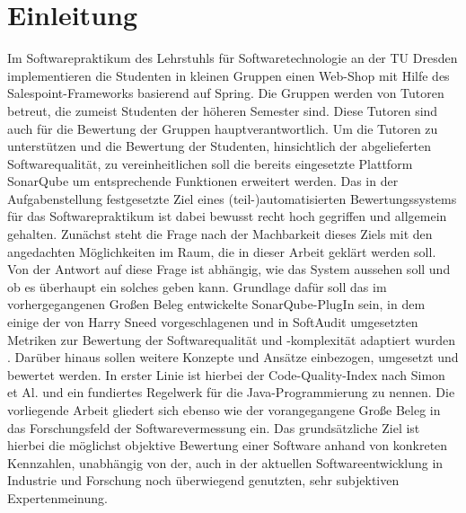 \documentclass[da,ngerman]{stthesis}
\begin{document}
	\chapter{Einleitung}
  		Im Softwarepraktikum des Lehrstuhls für Softwaretechnologie an der TU Dresden implementieren die Studenten in kleinen Gruppen einen Web-Shop mit Hilfe des Salespoint-Frameworks basierend auf Spring. Die Gruppen werden von Tutoren betreut, die zumeist Studenten der höheren Semester sind. Diese Tutoren sind auch für die Bewertung der Gruppen hauptverantwortlich. Um die Tutoren zu unterstützen und die Bewertung der Studenten, hinsichtlich der abgelieferten Softwarequalität, zu vereinheitlichen soll die bereits eingesetzte Plattform SonarQube um entsprechende Funktionen erweitert werden. Das in der Aufgabenstellung festgesetzte Ziel eines (teil-)automatisierten Bewertungssystems für das Softwarepraktikum ist dabei bewusst recht hoch gegriffen und allgemein gehalten. Zunächst steht die Frage nach der Machbarkeit dieses Ziels mit den angedachten Möglichkeiten im Raum, die in dieser Arbeit geklärt werden soll. Von der Antwort auf diese Frage ist abhängig, wie das System aussehen soll und ob es überhaupt ein solches geben kann. \newline
  		Grundlage dafür soll das im vorhergegangenen Großen Beleg entwickelte SonarQube-PlugIn sein, in dem einige der von Harry Sneed vorgeschlagenen und in SoftAudit umgesetzten Metriken zur Bewertung der Softwarequalität und -komplexität adaptiert wurden \cite{grosserBeleg}. Darüber hinaus sollen weitere Konzepte und Ansätze einbezogen, umgesetzt und bewertet werden. In erster Linie ist hierbei der Code-Quality-Index nach Simon et Al. \cite{CodeQualityManagement} und ein fundiertes Regelwerk für die Java-Programmierung zu nennen. \newline
  		Die vorliegende Arbeit gliedert sich ebenso wie der vorangegangene Große Beleg in das Forschungsfeld der Softwarevermessung ein. Das grundsätzliche Ziel ist hierbei die möglichst objektive  Bewertung einer Software anhand von konkreten Kennzahlen, unabhängig von der, auch in der aktuellen Softwareentwicklung in Industrie und Forschung noch überwiegend genutzten, sehr subjektiven Expertenmeinung. \newpage
\end{document}
